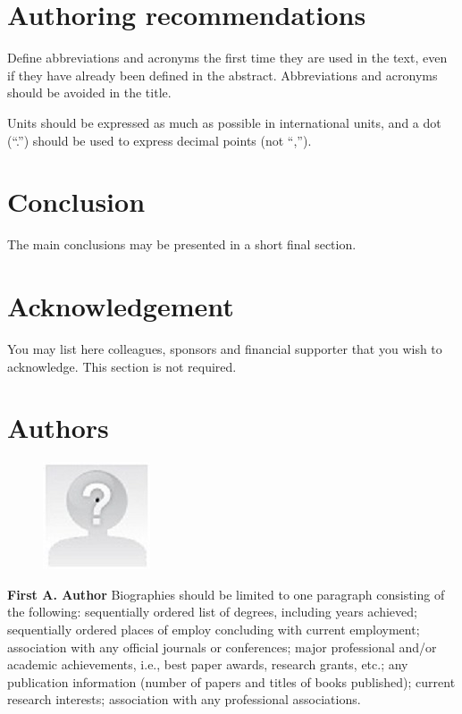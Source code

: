 \documentclass[10pt,a4paper,twocolumn]{article}
\newcommand{\ITUpar}{\vspace{8pt}\par}
\begin{document}
\section{Authoring recommendations}
\label{sec:sec10}
Define abbreviations and acronyms the first time they are used in the text, even if they have already been defined in the abstract.
Abbreviations and acronyms should be avoided in the title. \ITUpar
Units should be expressed as much as possible in international units, and a dot (``.'') should be used to express decimal points (not ``,'').


\section{Conclusion}
\label{sec:sec11}
The main conclusions may be presented in a short final section.


\section*{Acknowledgement}
\label{sec:ackn}
You may list here colleagues, sponsors and financial supporter that you wish to acknowledge.
This section is not required.


\printbibliography 

\newpage
\section*{Authors}
\label{sec:auth}

\begin{figure} 
    \vspace{-.1in}
    \includegraphics[width=0.39\columnwidth]{yourphotofilename.jpg} 
\end{figure}\textbf{First A. Author} Biographies should be limited to one paragraph consisting of the following: sequentially ordered list of degrees, including years achieved; sequentially ordered places of employ concluding with current employment; association with any official journals or conferences; major professional and/or academic achievements, i.e., best paper awards, research grants, etc.; any publication information (number of papers and titles of books published); current research interests; association with any professional associations.\ITUpar
\end{document}
